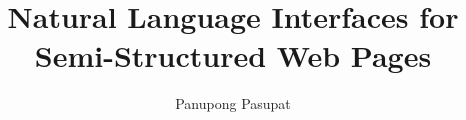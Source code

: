 \documentclass[12pt]{report}
\begin{document}
\title{Natural Language Interfaces for Semi-Structured Web Pages}
\author{Panupong Pasupat}
 
\beforepreface


\afterpreface

%
%
%
%

%
%

\appendix



\end{document}
